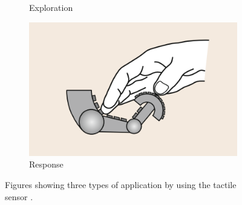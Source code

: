 \documentclass[USenglish]{ifimaster}  %
\begin{document}
\begin{figure}
\begin{subfigure}[b]{0.32\textwidth}
		\caption{Exploration}
		\label{fig:tact2}
	\end{subfigure}\hfill
	\begin{subfigure}[b]{0.32\textwidth}
		\centering
		\includegraphics[width=\linewidth]{Figures/tactiles3}
		\caption{Response}
		\label{fig:tact3}
	\end{subfigure}\hfill
	\caption{Figures showing three types of application by using the tactile sensor \cite{Cutkosky2008}.}
	\label{fig:tactiles}
\end{figure}

\FloatBarrier
\end{document}
